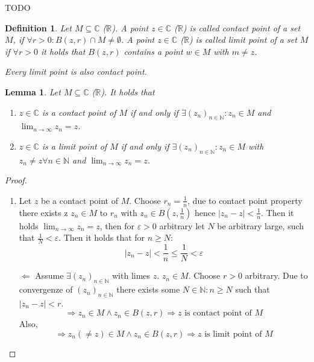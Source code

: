 \documentclass[a4paper,landscape,twocolumn]{article}
\newtheorem{defi}{Definition}
\newtheorem{lemma}{Lemma}
\newcommand\abs[1]{\left|#1\right|}
\newcommand\seq[1]{{\left(#1\right)}_{n \in \mathbb N}}
\begin{document}

TODO

\begin{defi}
  Let $M \subseteq \mathbb C$ ($\mathbb R$).
  A point $z \in \mathbb C$ ($\mathbb R$) is called \emph{contact point}
  of a set $M$, if $\forall r > 0: B(z, r) \cap M \neq \emptyset$.
  A point $z \in \mathbb C$ ($\mathbb R$) is called \emph{limit point}
  of a set $M$ if $\forall r > 0$ it holds that $B(z, r)$ contains a point
  $w \in M$ with $m \neq z$.

  Every limit point is also contact point.
\end{defi}


\begin{lemma}
  \label{characterization-limit-contact-points}
  Let $M \subseteq \mathbb C$ ($\mathbb R$). It holds that
  \begin{enumerate}
    \item $z \in \mathbb C$ is a contact point of $M$
      if and only if $\exists (z_n)_{n \in \mathbb N}: z_n \in M$ and $\lim_{n\to\infty} z_n = z$.
    \item $z \in \mathbb C$ is a limit point of $M$
      if and only if $\exists (z_n)_{n \in \mathbb N}: z_n \in M$ with $z_n \neq z \forall n \in \mathbb N$
      and $\lim_{n\to\infty} z_n = z$.
  \end{enumerate}

\end{lemma}
\begin{proof}
  \begin{enumerate}
    \item Let $z$ be a contact point of $M$. Choose $r_n = \frac1n$, due to contact point property
      there exists z $z_n \in M$ to $r_n$ with $z_n \in B(z, \frac1n)$ hence $\abs{z_n - z} < \frac1n$.
      Then it holds $\lim_{n\to\infty} z_n = z$, then for $\varepsilon > 0$ arbitrary let $N$ be arbitrary large,
      such that $\frac1N < \varepsilon$. Then it holds that for $n \geq N$:
      \[ \abs{z_n - z} < \frac1n \leq \frac1N < \varepsilon \]
    \item[$\Leftarrow$] Assume $\exists \seq{z_n}$ with limes $z$. $z_n \in M$.
      Choose $r > 0$ arbitrary. Due to convergenze of $\seq{z_n}$ there exists some
      $N \in \mathbb N: n \geq N$ such that $\abs{z_n - z} < r$.
      \[ \Rightarrow z_n \in M \land z_n \in B(z, r) \Rightarrow z \text{ is contact point of $M$} \]
      Also,
      \[ \Rightarrow z_n (\neq z) \in M \land z_n \in B(z, r) \Rightarrow z \text{ is limit point of $M$} \]
  \end{enumerate}
\end{proof}
\end{document}
